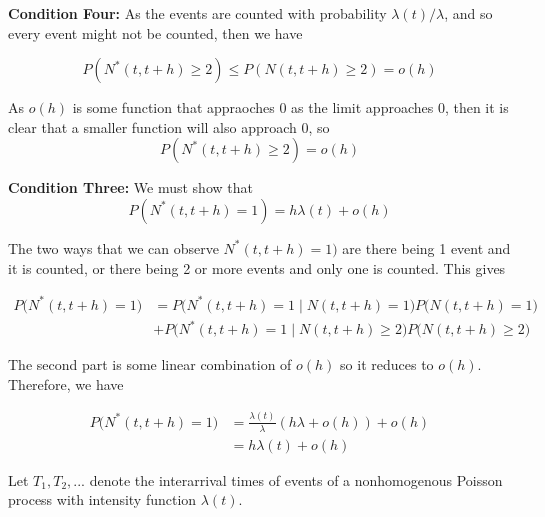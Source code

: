 \documentclass[10pt,a4paper]{exam}
\begin{document}
\begin{questions}
\begin{solution}
\textbf{Condition Four:}
As the events are counted with probability $\lambda(t)/\lambda$, and so every event might not be counted, then we have 

$$P(N^*(t, t+h) \geq 2) \leq P(N(t, t+h) \geq 2) = o(h)$$

As $o(h)$ is some function that appraoches 0 as the limit approaches 0, then it is clear that a smaller function will also approach 0, so 
$$P(N^*(t, t+h) \geq 2) = o(h)$$

\textbf{Condition Three:}
We must show that
$$P(N^*(t, t+h) = 1) =  h\lambda(t) + o(h)$$

The two ways that we can observe $N^*(t, t+h) = 1)$ are there being 1 event and it is counted, or there being 2 or more events and only one is counted. This gives

\begin{align*}
P\Big(N^*(t, t+h) = 1\Big)		&= P\Big(N^*(t, t+h) = 1 \mid N(t, t+h) = 1\Big)P\Big(N(t, t+h) = 1\Big)\\
											&+ P\Big(N^*(t, t+h) = 1 \mid N(t, t+h) \geq 2\Big)P\Big(N(t, t+h) \geq 2\Big)
\end{align*}

The second part is some linear combination of $o(h)$ so it reduces to $o(h)$. Therefore, we have

\begin{align*}
P\Big(N^*(t, t+h) = 1\Big)		&= \frac{\lambda(t)}{\lambda} (h\lambda + o(h)) + o(h)\\
											&= h\lambda(t) + o(h)
\end{align*}


\end{solution}
\pagebreak
\question Let $T_1, T_2, ...$ denote the interarrival times of events of a nonhomogenous Poisson process with intensity function $\lambda(t)$.

\end{questions}
\end{document}
